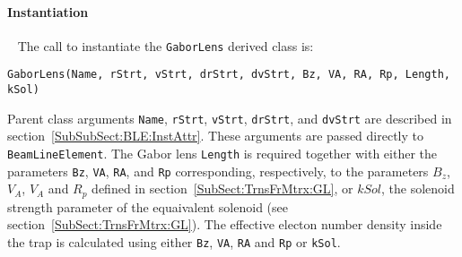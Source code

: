 \paragraph{Instantiation} ~\newline
\noindent
The call to instantiate the \texttt{GaborLens} derived class is:
\begin{center}
  \texttt{GaborLens(Name, rStrt, vStrt, drStrt, dvStrt,
          Bz, VA, RA, Rp, Length, kSol)}
\end{center}
Parent class arguments \texttt{Name}, \texttt{rStrt}, \texttt{vStrt},
\texttt{drStrt}, and \texttt{dvStrt} are described in
section~\ref{SubSubSect:BLE:InstAttr}.
These arguments are passed directly to \texttt{BeamLineElement}.
The Gabor lens \texttt{Length} is required together with either the
parameters \texttt{Bz}, \texttt{VA}, \texttt{RA}, and \texttt{Rp}
corresponding, respectively, to the parameters $B_z$, $V_A$, $V_A$ and
$R_p$ defined in section~\ref{SubSect:TrnsFrMtrx:GL}, or $kSol$, the
solenoid strength parameter of the equaivalent solenoid (see
section~\ref{SubSect:TrnsFrMtrx:GL}).
The effective electon number density inside the trap is calculated
using either \texttt{Bz}, \texttt{VA}, \texttt{RA} and \texttt{Rp}
or \texttt{kSol}.

